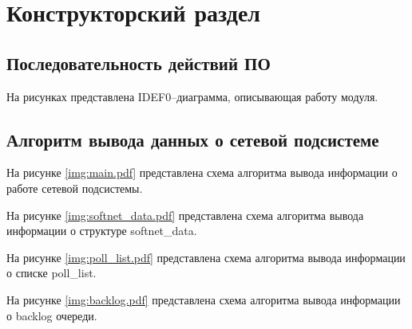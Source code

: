 \chapter{Конструкторский раздел}

\section{Последовательность действий ПО}

На рисунках представлена IDEF0--диаграмма, описывающая работу модуля.

\section{Алгоритм вывода данных о сетевой подсистеме}

На рисунке \ref{img:main.pdf} представлена схема алгоритма вывода информации о работе сетевой подсистемы.

\FloatBarrier

На рисунке \ref{img:softnet_data.pdf} представлена схема алгоритма вывода информации о структуре softnet\_data.

\FloatBarrier

На рисунке \ref{img:poll_list.pdf} представлена схема алгоритма вывода информации о списке poll\_list.

\FloatBarrier

На рисунке \ref{img:backlog.pdf} представлена схема алгоритма вывода информации о backlog очереди.

\FloatBarrier